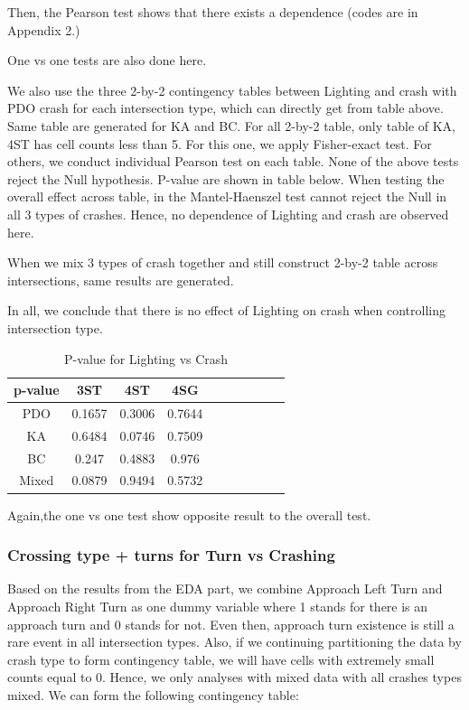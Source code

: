\documentclass[11pt]{scrartcl} %
\begin{document}
Then, the Pearson test shows that there exists a dependence (codes are in Appendix 2.)

One vs one tests are also done here.

We also use the three 2-by-2 contingency tables between Lighting and crash with PDO crash for each intersection type, which can directly get from table above.  Same table are generated for KA and BC. For all 2-by-2 table, only table of KA, 4ST has cell counts less than 5. For this one, we apply Fisher-exact test. For others, we conduct individual Pearson test on each table. None of the above tests reject the Null hypothesis. P-value are shown in table below. When testing the overall effect across table, in the Mantel-Haenszel test cannot reject the Null in all 3 types of crashes. Hence, no dependence of Lighting and crash are observed here.

When we mix 3 types of crash together and still construct 2-by-2 table across intersections, same results are generated.

In all, we conclude that there is no effect of Lighting on crash when controlling intersection type.

\begin{table}[H]
\caption{P-value for Lighting vs Crash}
\centering
\begin{tabular}{|c|c|c|c|c|c|c|c|c|c|}
\hline
p-value & 3ST & 4ST & 4SG  \\
\hline
PDO & 0.1657 & 0.3006 & 0.7644 \\
\hline
KA & 0.6484 & 0.0746 & 0.7509\\
\hline
BC & 0.247  & 0.4883 & 0.976 \\
\hline
Mixed & 0.0879 & 0.9494 & 0.5732 \\
\hline
\end{tabular}
\end{table}

Again,the one vs one test show opposite result to the overall test.

\subsubsection{Crossing type + turns for Turn vs Crashing}

Based on the results from the EDA part, we combine Approach Left Turn and Approach Right Turn as one dummy variable where 1 stands for there is an approach turn and 0 stands for not. Even then, approach turn existence is still a rare event in all intersection types.  Also, if we continuing partitioning the data by crash type to form contingency table, we will have cells with extremely small counts equal to 0. Hence, we only analyses with mixed data with all crashes types mixed. We can form the following contingency table:
\end{document}
